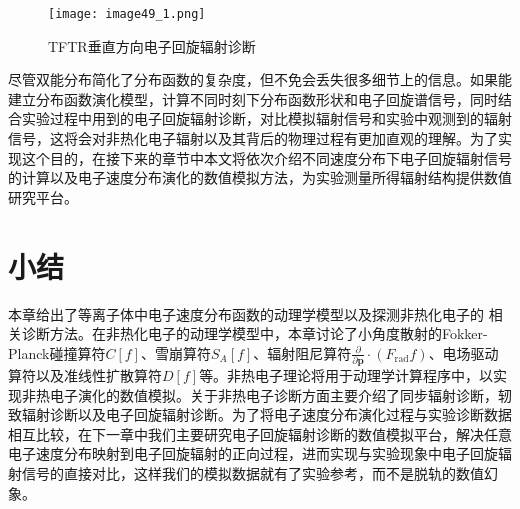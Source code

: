 \begin{figure}[ht]
\centering
\texttt{[image: image49\_1.png]}
\caption{\label{fig:VECE}TFTR垂直方向电子回旋辐射诊断\cite{RN2037}}
\end{figure}
  \par 尽管双能分布简化了分布函数的复杂度，但不免会丢失很多细节上的信息。如果能建立分布函数演化模型，计算不同时刻下分布函数形状和电子回旋谱信号，同时结合实验过程中用到的电子回旋辐射诊断，对比模拟辐射信号和实验中观测到的辐射信号，这将会对非热化电子辐射以及其背后的物理过程有更加直观的理解。为了实现这个目的，在接下来的章节中本文将依次介绍不同速度分布下电子回旋辐射信号的计算以及电子速度分布演化的数值模拟方法，为实验测量所得辐射结构提供数值研究平台。
\section{小结}
本章给出了等离子体中电子速度分布函数的动理学模型以及探测非热化电子的
相关诊断方法。在非热化电子的动理学模型中，本章讨论了小角度散射的Fokker-Planck碰撞算符$C[f]$、雪崩算符$S_A[f]$、辐射阻尼算符$\frac{\partial}{\partial \boldsymbol{p}} \cdot\left(F_{\mathrm{rad}} f\right)$、电场驱动算符以及准线性扩散算符$D[f]$等。非热电子理论将用于动理学计算程序中，以实现非热电子演化的数值模拟。关于非热电子诊断方面主要介绍了同步辐射诊断，轫致辐射诊断以及电子回旋辐射诊断。为了将电子速度分布演化过程与实验诊断数据相互比较，在下一章中我们主要研究电子回旋辐射诊断的数值模拟平台，解决任意电子速度分布映射到电子回旋辐射的正向过程，进而实现与实验现象中电子回旋辐射信号的直接对比，这样我们的模拟数据就有了实验参考，而不是脱轨的数值幻象。 

















